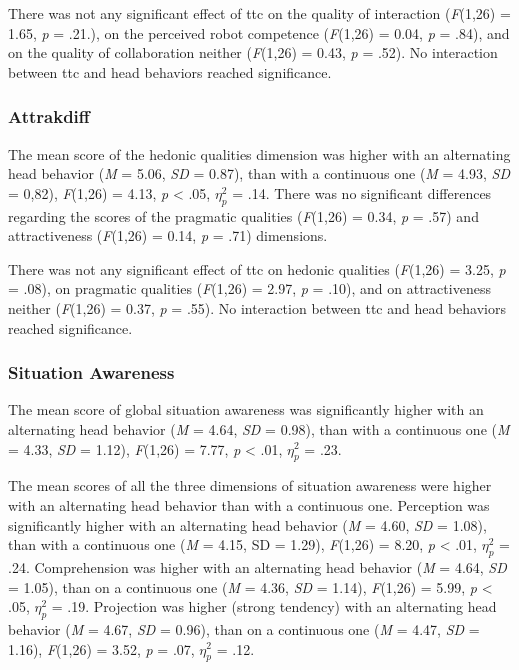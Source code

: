 \documentclass[a4paper,11pt,twoside]{StyleThese}
\begin{document}
There was not any significant effect of \acrshort{ttc} on the quality of interaction (\textit{F}(1,26) = 1.65, \textit{p} = .21.), on the perceived robot competence (\textit{F}(1,26) = 0.04, \textit{p} = .84), and on the quality of collaboration neither (\textit{F}(1,26) = 0.43, \textit{p} = .52). No interaction between \acrshort{ttc} and head behaviors reached significance.

\subsubsection{Attrakdiff}
The mean score of the hedonic qualities dimension was higher with an alternating head behavior (\textit{M} = 5.06, \textit{SD} = 0.87), than with a continuous one (\textit{M} = 4.93, \textit{SD} = 0,82), \textit{F}(1,26) = 4.13, \textit{p} < .05, $\eta_{p}^{2}$ = .14. There was no significant differences regarding the scores of the pragmatic qualities (\textit{F}(1,26) = 0.34, \textit{p} = .57) and attractiveness (\textit{F}(1,26) = 0.14, \textit{p} = .71) dimensions. 

There was not any significant effect of \acrshort{ttc} on hedonic qualities (\textit{F}(1,26) = 3.25, \textit{p} = .08), on pragmatic qualities (\textit{F}(1,26) = 2.97, \textit{p} = .10), and on attractiveness neither (\textit{F}(1,26) = 0.37, \textit{p} = .55). No interaction between \acrshort{ttc} and head behaviors reached significance.

\subsubsection{Situation Awareness}
The mean score of global situation awareness was significantly higher with an alternating head behavior (\textit{M} = 4.64, \textit{SD} = 0.98), than with a continuous one (\textit{M} = 4.33, \textit{SD} = 1.12), \textit{F}(1,26) = 7.77, \textit{p} < .01, $\eta_{p}^{2}$ = .23.

The mean scores of all the three dimensions of situation awareness were higher with an alternating head behavior than with a continuous one. Perception was significantly higher with an alternating head behavior (\textit{M} = 4.60, \textit{SD} = 1.08), than with a continuous one (\textit{M} = 4.15, SD = 1.29), \textit{F}(1,26) = 8.20, \textit{p} < .01, $\eta_{p}^{2}$ = .24. Comprehension was higher with an alternating head behavior (\textit{M} = 4.64, \textit{SD} = 1.05), than on a continuous one (\textit{M} = 4.36, \textit{SD} = 1.14), \textit{F}(1,26) = 5.99, \textit{p} < .05, $\eta_{p}^{2}$ = .19. Projection was higher (strong tendency) with an alternating head behavior (\textit{M} = 4.67, \textit{SD} = 0.96), than on a continuous one (\textit{M} = 4.47, \textit{SD} = 1.16), \textit{F}(1,26) = 3.52, \textit{p} = .07, $\eta_{p}^{2}$ = .12.
\end{document}
